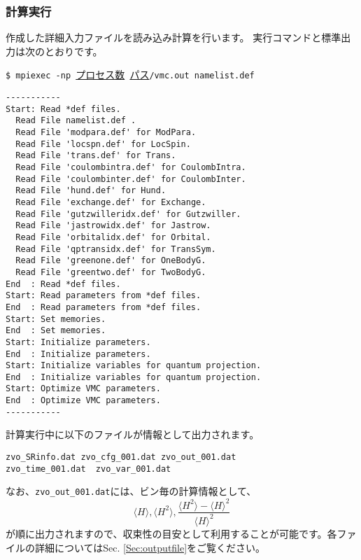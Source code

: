 \subsubsection{計算実行}
作成した詳細入力ファイルを読み込み計算を行います。
実行コマンドと標準出力は次のとおりです。

\vspace{1cm}\hspace{-0.7cm}
\verb|$ mpiexec -np |\underline{プロセス数}\verb| |\underline{パス}\verb|/vmc.out namelist.def|
\small

\begin{verbatim}
-----------
Start: Read *def files.
  Read File namelist.def .
  Read File 'modpara.def' for ModPara.
  Read File 'locspn.def' for LocSpin.
  Read File 'trans.def' for Trans.
  Read File 'coulombintra.def' for CoulombIntra.
  Read File 'coulombinter.def' for CoulombInter.
  Read File 'hund.def' for Hund.
  Read File 'exchange.def' for Exchange.
  Read File 'gutzwilleridx.def' for Gutzwiller.
  Read File 'jastrowidx.def' for Jastrow.
  Read File 'orbitalidx.def' for Orbital.
  Read File 'qptransidx.def' for TransSym.
  Read File 'greenone.def' for OneBodyG.
  Read File 'greentwo.def' for TwoBodyG.
End  : Read *def files.
Start: Read parameters from *def files.
End  : Read parameters from *def files.
Start: Set memories.
End  : Set memories.
Start: Initialize parameters.
End  : Initialize parameters.
Start: Initialize variables for quantum projection.
End  : Initialize variables for quantum projection.
Start: Optimize VMC parameters.
End  : Optimize VMC parameters.
-----------
\end{verbatim}

計算実行中に以下のファイルが情報として出力されます。
\\
\begin{minipage}{12cm}
\begin{screen}
\begin{verbatim}
zvo_SRinfo.dat zvo_cfg_001.dat zvo_out_001.dat
zvo_time_001.dat  zvo_var_001.dat
\end{verbatim}
\end{screen}
\end{minipage}

なお、\verb|zvo_out_001.dat|には、ビン毎の計算情報として、
\begin{equation}
\langle H \rangle, \langle H^2 \rangle, \frac{\langle H^2 \rangle- \langle H \rangle^2 }{\langle H \rangle^2} \nonumber
\end{equation}
が順に出力されますので、収束性の目安として利用することが可能です。各ファイルの詳細についてはSec. \ref{Sec:outputfile}をご覧ください。\\

